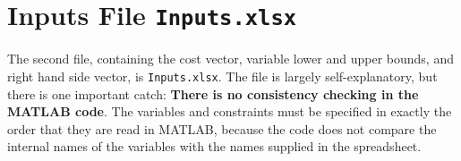 \documentclass[11pt]{article}
\newcommand{\inputs}{\texttt{Inputs.xlsx}}
\begin{document}
\section{Inputs File \inputs}

The second file, containing the cost vector, variable lower and upper bounds, and right hand side vector, is \inputs.
The file is largely self-explanatory, but there is one important catch:
\textbf{There is no consistency checking in the MATLAB code}.
The variables and constraints must be specified in exactly the order that they are read in MATLAB, because the code does not compare the internal names of the variables with the names supplied in the spreadsheet.
\end{document}
